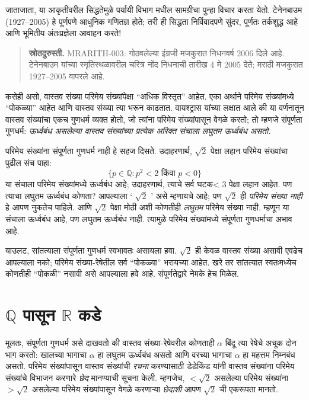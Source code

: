 \documentclass[11pt,a4paper,openany]{book}
\theoremstyle{definition}
\newcommand{\Setabs}[2]{\{#1:#2\}}
\newcommand{\Rat}{\mathbb{Q}}
\newcommand{\Real}{\mathbb{R}}
\begin{document}
जाताजाता, या आकृतीवरील सिद्धतेमुळे पर्यायी विभाग
मधील सामग्रीचा पुन्हा विचार करता येतो. टेनेनबाउम (1927--2005) हे पूर्णपणे
आधुनिक गणितज्ञ होते; तरी ही सिद्धता निर्विवादपणे सुंदर, पूर्णतः तर्कशुद्ध
आहे आणि भूमितीय अंतःप्रज्ञेला आवाहन करते!
\begin{quote}\small\textbf{स्रोतदुरुस्ती.} MRARITH-003: गोठवलेल्या इंग्रजी मजकुरात निधनवर्ष 2006 दिले आहे. टेनेनबाउम यांच्या स्मृतिस्थळावरील चरित्र नोंद निधनाची तारीख 4 मे 2005 देते; मराठी मजकुरात 1927--2005 वापरले आहे.\end{quote}

कसेही असो, वास्तव संख्या परिमेय संख्यांपेक्षा ``अधिक विस्तृत'' आहेत.
एका अर्थाने परिमेय संख्यांमध्ये ``पोकळ्या'' आहेत आणि वास्तव संख्या त्या
भरून काढतात. वायश्ट्रास यांच्या लक्षात आले की या वर्णनातून वास्तव
संख्यांचा एकच गुणधर्म व्यक्त होतो, जो त्यांना परिमेय संख्यांपासून वेगळे
करतो; तो म्हणजे संपूर्णता गुणधर्म: \emph{ऊर्ध्वबंध असलेल्या वास्तव
संख्यांच्या प्रत्येक अरिक्त संचाला लघुतम ऊर्ध्वबंध असतो.}

परिमेय संख्यांना संपूर्णता गुणधर्म नाही हे सहज दिसते. उदाहरणार्थ,
$\sqrt{2}$ पेक्षा लहान परिमेय संख्यांचा पुढील संच पाहा:
\[
	\Setabs{p \in \Rat}{p^2 < 2 \text{ किंवा }p < 0}
\]
या संचाला परिमेय संख्यांमध्ये ऊर्ध्वबंध आहे; उदाहरणार्थ, त्याचे सर्व
घटक< $3$ पेक्षा लहान आहेत. पण त्याचा लघुतम ऊर्ध्वबंध कोणता?
आपल्याला ` $\sqrt{2}$ ' असे म्हणायचे आहे; पण $\sqrt{2}$ ही \emph{परिमेय
संख्या नाही} हे आपण नुकतेच पाहिले. आणि $\sqrt{2}$ पेक्षा मोठी अशी कोणतीही
\emph{लघुतम} परिमेय संख्या नाही. म्हणून या संचाला ऊर्ध्वबंध आहे, पण लघुतम
ऊर्ध्वबंध नाही. त्यामुळे परिमेय संख्यांमध्ये संपूर्णता गुणधर्माचा अभाव आहे.

याउलट, सांतत्याला संपूर्णता गुणधर्म स्वभावतः असायला हवा. $\sqrt{2}$ ही
केवळ वास्तव संख्या असावी एवढेच आपल्याला नको; परिमेय संख्या-रेषेतील सर्व
``पोकळ्या'' भरायच्या आहेत. खरे तर सांतत्यात स्वतःमध्येच कोणतीही ``पोकळी''
नसावी असे आपल्याला हवे आहे. संपूर्णतेद्वारे नेमके हेच मिळेल.







\section{$\Rat$ पासून $\Real$ कडे}\label{sfr:arith:cuts:sec}

मूलतः, संपूर्णता गुणधर्म असे दाखवतो की वास्तव संख्या-रेषेवरील कोणताही
$\alpha$ बिंदू त्या रेषेचे अचूक दोन भाग करतो: खालच्या भागाचा $\alpha$
हा लघुतम ऊर्ध्वबंध असतो आणि वरच्या भागाचा $\alpha$ हा महत्तम निम्नबंध
असतो. परिमेय संख्यांपासून वास्तव संख्यांची \emph{रचना} करण्यासाठी
डेडेकिंड यांनी वास्तव संख्यांना परिमेय संख्यांचे विभाजन करणारे
\emph{छेद} मानण्याची सूचना केली. म्हणजेच, $< \sqrt{2}$ असलेल्या परिमेय
संख्यांना $> \sqrt{2}$ असलेल्या परिमेय संख्यांपासून वेगळे करणाऱ्या
\emph{छेदाशी} आपण $\sqrt{2}$ ची एकरूपता मानतो.
\end{document}
